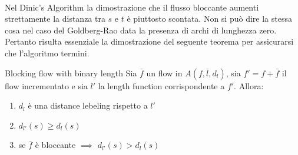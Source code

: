 \documentclass[a4paper, 11pt]{report}
\begin{document}
    \paragraph*{}Nel Dinic's Algorithm la dimostrazione che il flusso bloccante aumenti strettamente la distanza tra $s$ e $t$ è piuttosto scontata.
    Non si può dire la stessa cosa nel caso del Goldberg-Rao data la presenza di archi di lunghezza zero. Pertanto risulta essenziale la dimostrazione del seguente teorema per assicurarsi che l'algoritmo termini.
    \begin{theo}{Blocking flow with binary length}{}
        Sia $\bar{f}$ un flow in $A(f,\bar{l}, d_l)$, sia $f' = f + \bar{f}$ il flow incrementato e sia 
        $l'$  la length function corrispondente a $f'$. Allora:
        \begin{enumerate}
            \item $d_l$ è una distance lebeling rispetto a $l'$
            \item $d_{l'}(s) \ge d_l(s)$
            \item  se $\bar{f}$ è bloccante $\implies$ $d_{l'}(s) > d_l(s)$
        \end{enumerate}
    \end{theo}
\end{document}
